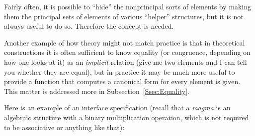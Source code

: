 \documentclass{mtmtcl}
\theoremstyle{plain}
\theoremstyle{remark}
\begin{document}
Fairly often, it is possible to ``hide'' the nonprincipal sorts of 
elements by making them the principal sets of elements of various 
``helper'' structures, but it is not always useful to do so. 
Therefore the concept is needed.

Another example of how theory might not match practice is that in 
theoretical constructions it is often sufficient to know equality (or 
congruence, depending on how one looks at it) as an \emph{implicit} 
relation (give me two elements and I can tell you whether they are 
equal), but in practice it may be much more useful to provide a 
function that computes a canonical form for every element is given. 
This matter is addressed more in Subsection~\ref{Ssec:Equality}.


Here is an example of an interface specification (recall that a 
\emph{magma} is an algebraic structure with a binary multiplication 
operation, which is not required to be associative or anything like 
that):
\end{document}
